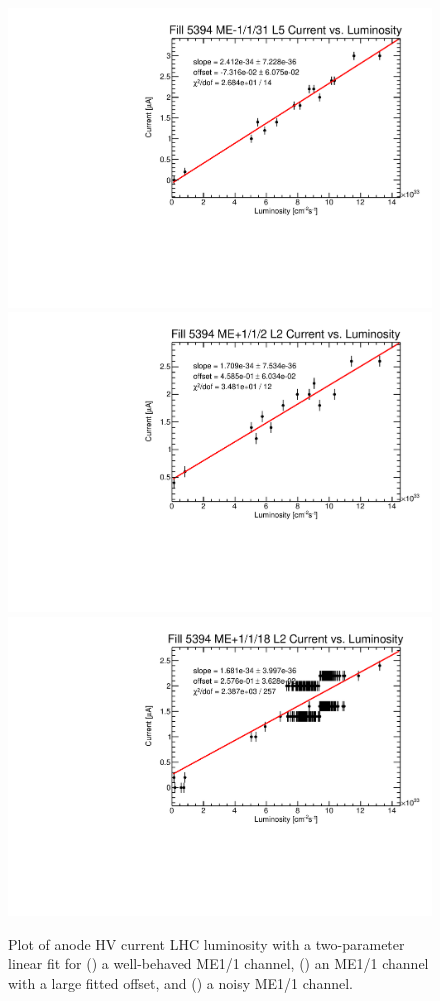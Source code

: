\begin{figure}
	\centering
	\includegraphics[width=\twoThirdsFigWidth]{figures/neutron/ME11_N_31_5_f5394_curr_lumi.pdf}
	\includegraphics[width=\twoThirdsFigWidth]{figures/neutron/ME11_P_02_2_f5394_curr_lumi.pdf}
	\includegraphics[width=\twoThirdsFigWidth]{figures/neutron/ME11_P_18_2_f5394_curr_lumi.pdf}
	\caption{Plot of anode HV current \vs LHC luminosity with a two-parameter linear fit for () a well-behaved ME1/1 channel, () an ME1/1 channel with a large fitted offset, and () a noisy ME1/1 channel.}
	\label{fig:ME11_IvsL}
\end{figure}

